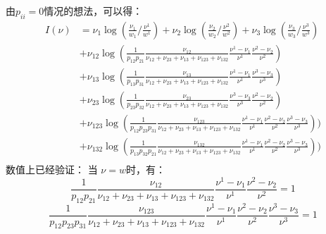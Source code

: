 \documentclass[cn,hazy,egreen,14pt,normal]{elegantnote}
\begin{document}
由$p_{ii}=0$情况的想法，可以得：
\begin{align*}
    I(\nu)
    &= 
    \nu_1 \log(\frac{\nu_1}{w_1} / \frac{\nu^1}{w^1})
    + \nu_2 \log(\frac{\nu_2}{w_2} / \frac{\nu^2}{w^2})
    + \nu_3 \log(\frac{\nu_3}{w_3} / \frac{\nu^3}{w^3}) \\
    &+\nu_{12} \log(\frac{1}{p_{12}p_{21}} \frac{\nu_{12}}{\nu_{12}+\nu_{23}+\nu_{13}+\nu_{123}+\nu_{132}} 
    \frac{\nu^{1}-\nu_{1}}{\nu^{1}}\frac{\nu^{2}-\nu_{2}}{\nu^{2}}) \\
    &+ \nu_{13} \log(\frac{1}{p_{13}p_{31}} \frac{\nu_{13}}{\nu_{12}+\nu_{23}+\nu_{13}+\nu_{123}+\nu_{132}}
    \frac{\nu^{1}-\nu_{1}}{\nu^{1}}\frac{\nu^{3}-\nu_{3}}{\nu^{3}}) \\
    &+ \nu_{23} \log(\frac{1}{p_{23}p_{32}} \frac{\nu_{23}}{\nu_{12}+\nu_{23}+\nu_{13}+\nu_{123}+\nu_{132}} 
    \frac{\nu^{3}-\nu_{3}}{\nu^{3}}\frac{\nu^{2}-\nu_{2}}{\nu^{2}}) \\
    &+ \nu_{123} \log(\frac{1}{p_{12}p_{23}p_{31}} \frac{\nu_{123}}{\nu_{12}+\nu_{23}+\nu_{13}+\nu_{123}+\nu_{132}}
    \frac{\nu^{1}-\nu_{1}}{\nu^{1}}\frac{\nu^{2}-\nu_{2}}{\nu^{2}} \frac{\nu^{3}-\nu_{3}}{\nu^{3}})) \\
    &+ \nu_{132} \log(\frac{1}{p_{13}p_{32}p_{21}} \frac{\nu_{132}}{\nu_{12}+\nu_{23}+\nu_{13}+\nu_{123}+\nu_{132}}
    \frac{\nu^{1}-\nu_{1}}{\nu^{1}}\frac{\nu^{2}-\nu_{2}}{\nu^{2}} \frac{\nu^{3}-\nu_{3}}{\nu^{3}})) \\
\end{align*}
数值上已经验证：
当 $\nu=w$时，有：
$$
\frac{1}{p_{12}p_{21}} \frac{\nu_{12}}{\nu_{12}+\nu_{23}+\nu_{13}+\nu_{123}+\nu_{132}} \frac{\nu^{1}-\nu_{1}}{\nu^{1}}\frac{\nu^{2}-\nu_{2}}{\nu^{2}} = 1
$$
$$
\frac{1}{p_{12}p_{23}p_{31}} \frac{\nu_{123}}{\nu_{12}+\nu_{23}+\nu_{13}+\nu_{123}+\nu_{132}}\frac{\nu^{1}-\nu_{1}}{\nu^{1}}\frac{\nu^{2}-\nu_{2}}{\nu^{2}} \frac{\nu^{3}-\nu_{3}}{\nu^{3}} = 1
$$
\end{document}
